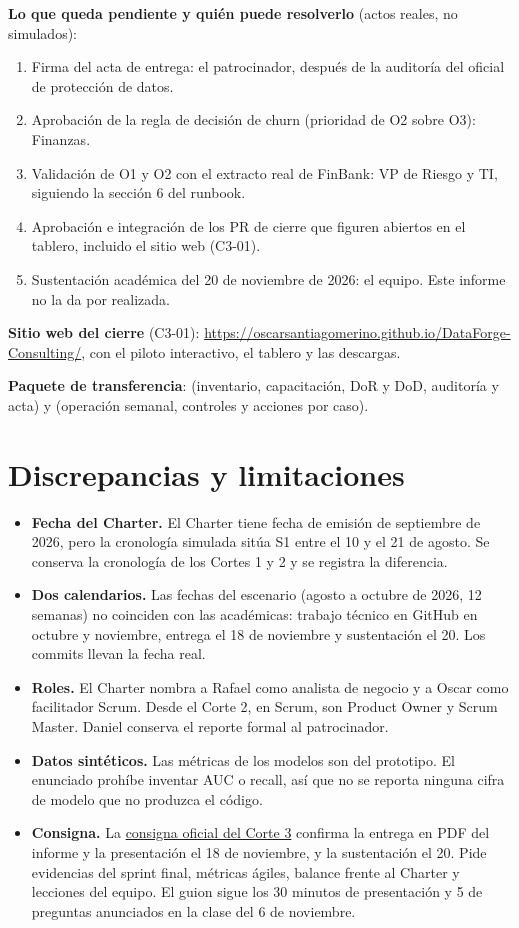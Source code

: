 \documentclass[10pt,a4paper]{article}
\begin{document}
\textbf{Lo que queda pendiente y quién puede resolverlo} (actos reales, no simulados):
\begin{enumerate}
\item Firma del acta de entrega: el patrocinador, después de la auditoría del oficial de protección de datos.
\item Aprobación de la regla de decisión de churn (prioridad de O2 sobre O3): Finanzas.
\item Validación de O1 y O2 con el extracto real de FinBank: VP de Riesgo y TI, siguiendo la sección 6 del runbook.
\item Aprobación e integración de los PR de cierre que figuren abiertos en el tablero, incluido el sitio web (C3-01).
\item Sustentación académica del 20 de noviembre de 2026: el equipo. Este informe no la da por realizada.
\end{enumerate}

\textbf{Sitio web del cierre} (C3-01): \url{https://oscarsantiagomerino.github.io/DataForge-Consulting/}, con el piloto interactivo, el tablero y las descargas.

\textbf{Paquete de transferencia}:  (inventario, capacitación, DoR y DoD, auditoría y acta) y  (operación semanal, controles y acciones por caso).

\section{Discrepancias y limitaciones}
\begin{itemize}
\item \textbf{Fecha del Charter.} El Charter tiene fecha de emisión de septiembre de 2026, pero la cronología simulada sitúa S1 entre el 10 y el 21 de agosto. Se conserva la cronología de los Cortes 1 y 2 y se registra la diferencia.
\item \textbf{Dos calendarios.} Las fechas del escenario (agosto a octubre de 2026, 12 semanas) no coinciden con las académicas: trabajo técnico en GitHub en octubre y noviembre, entrega el 18 de noviembre y sustentación el 20. Los commits llevan la fecha real.
\item \textbf{Roles.} El Charter nombra a Rafael como analista de negocio y a Oscar como facilitador Scrum. Desde el Corte 2, en Scrum, son Product Owner y Scrum Master. Daniel conserva el reporte formal al patrocinador.
\item \textbf{Datos sintéticos.} Las métricas de los modelos son del prototipo. El enunciado prohíbe inventar AUC o recall, así que no se reporta ninguna cifra de modelo que no produzca el código.
\item \textbf{Consigna.} La \href{https://ciclovidasoft.my.canva.site/}{consigna oficial del Corte 3} confirma la entrega en PDF del informe y la presentación el 18 de noviembre, y la sustentación el 20. Pide evidencias del sprint final, métricas ágiles, balance frente al Charter y lecciones del equipo. El guion sigue los 30 minutos de presentación y 5 de preguntas anunciados en la clase del 6 de noviembre.
\end{itemize}
\end{document}
